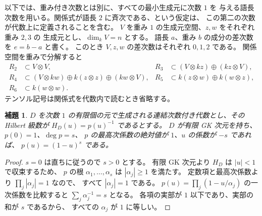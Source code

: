 \documentclass[11pt,a4paper]{ltjsarticle}
\newtheorem{lemma}[theorem]{補題}
\theoremstyle{definition}
\begin{document}
以下では、重み付き次数とは別に、すべての最小生成元に次数 $1$ を
与える語長次数を用いる。関係式が語長 $2$ に斉次である、という仮定は、
この第二の次数が代数上に定義されることを含む。
$V$ を重み $1$ の生成元空間、$z,w$ をそれぞれ重み $2,3$ の
生成元とし、$\dim_kV=n$ とする。
語長 $a$、重み $b$ の成分の差次数を $e=b-a$ と書く。
このとき $V,z,w$ の差次数はそれぞれ $0,1,2$ である。
関係空間を重みで分解すると
\begin{align}
 R_2&\subset V\otimes V,&
 R_3&\subset (V\otimes kz)\oplus(kz\otimes V),\label{eq:general-relation-spaces-a}\\
 R_4&\subset(V\otimes kw)\oplus k(z\otimes z)
                    \oplus(kw\otimes V),&
 R_5&\subset k(z\otimes w)\oplus k(w\otimes z),\label{eq:general-relation-spaces-b}\\
 R_6&\subset k(w\otimes w).&&\label{eq:general-relation-spaces-c}
\end{align}
テンソル記号は関係式を代数内で読むとき省略する。

\begin{lemma}\label{lem:unit-circle-hilbert}
$D$ を次数 $1$ の有限個の元で生成される連結次数付き代数とし、その Hilbert 級数が
$H_D(u)=p(u)^{-1}$ であるとする。
$D$ が有限 GK 次元を持ち、$p(0)=1$、$\deg p=s$、
$p$ の最高次係数の絶対値が $1$、$u$ の係数が $-s$ であれば、
$p(u)=(1-u)^s$ である。
\end{lemma}

\begin{proof}
$s=0$ は直ちに従うので $s>0$ とする。
有限 GK 次元より $H_D$ は $|u|<1$ で収束するため、
$p$ の根 $\alpha_1,\ldots,\alpha_s$ は $|\alpha_j|\geq1$ を満たす。
定数項と最高次係数より $\prod_j|\alpha_j|=1$ なので、
すべて $|\alpha_j|=1$ である。
$p(u)=\prod_j(1-u/\alpha_j)$ の一次係数を比較すると
$\sum_j\alpha_j^{-1}=s$ となる。
各項の実部が $1$ 以下であり、実部の和が $s$ であるから、
すべての $\alpha_j$ が $1$ に等しい。
\end{proof}
\end{document}
